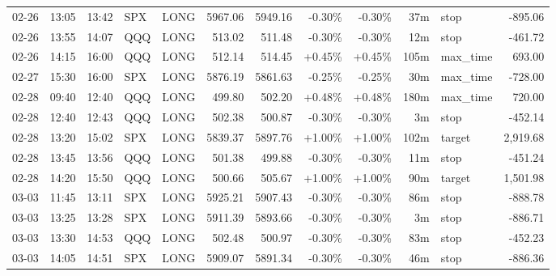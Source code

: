 \documentclass[11pt,a4paper]{article}
\begin{document}
\begin{center}
\begin{longtable}{>{\color{txtmain}}l l l l l r r r r r >{\color{txtmain}}l r}
02-26 & 13:05 & 13:42 & SPX & LONG & 5967.06 & 5949.16 & \textcolor{lossred}{-0.30\%} & \textcolor{lossred}{-0.30\%} & 37m & stop & \textcolor{lossred}{-895.06} \\
02-26 & 13:55 & 14:07 & QQQ & LONG & 513.02 & 511.48 & \textcolor{lossred}{-0.30\%} & \textcolor{lossred}{-0.30\%} & 12m & stop & \textcolor{lossred}{-461.72} \\
02-26 & 14:15 & 16:00 & QQQ & LONG & 512.14 & 514.45 & \textcolor{wingreen}{+0.45\%} & \textcolor{wingreen}{+0.45\%} & 105m & max\_time & \textcolor{wingreen}{693.00} \\
02-27 & 15:30 & 16:00 & SPX & LONG & 5876.19 & 5861.63 & \textcolor{lossred}{-0.25\%} & \textcolor{lossred}{-0.25\%} & 30m & max\_time & \textcolor{lossred}{-728.00} \\
02-28 & 09:40 & 12:40 & QQQ & LONG & 499.80 & 502.20 & \textcolor{wingreen}{+0.48\%} & \textcolor{wingreen}{+0.48\%} & 180m & max\_time & \textcolor{wingreen}{720.00} \\
02-28 & 12:40 & 12:43 & QQQ & LONG & 502.38 & 500.87 & \textcolor{lossred}{-0.30\%} & \textcolor{lossred}{-0.30\%} & 3m & stop & \textcolor{lossred}{-452.14} \\
02-28 & 13:20 & 15:02 & SPX & LONG & 5839.37 & 5897.76 & \textcolor{wingreen}{+1.00\%} & \textcolor{wingreen}{+1.00\%} & 102m & target & \textcolor{wingreen}{2,919.68} \\
02-28 & 13:45 & 13:56 & QQQ & LONG & 501.38 & 499.88 & \textcolor{lossred}{-0.30\%} & \textcolor{lossred}{-0.30\%} & 11m & stop & \textcolor{lossred}{-451.24} \\
02-28 & 14:20 & 15:50 & QQQ & LONG & 500.66 & 505.67 & \textcolor{wingreen}{+1.00\%} & \textcolor{wingreen}{+1.00\%} & 90m & target & \textcolor{wingreen}{1,501.98} \\
03-03 & 11:45 & 13:11 & SPX & LONG & 5925.21 & 5907.43 & \textcolor{lossred}{-0.30\%} & \textcolor{lossred}{-0.30\%} & 86m & stop & \textcolor{lossred}{-888.78} \\
03-03 & 13:25 & 13:28 & SPX & LONG & 5911.39 & 5893.66 & \textcolor{lossred}{-0.30\%} & \textcolor{lossred}{-0.30\%} & 3m & stop & \textcolor{lossred}{-886.71} \\
03-03 & 13:30 & 14:53 & QQQ & LONG & 502.48 & 500.97 & \textcolor{lossred}{-0.30\%} & \textcolor{lossred}{-0.30\%} & 83m & stop & \textcolor{lossred}{-452.23} \\
03-03 & 14:05 & 14:51 & SPX & LONG & 5909.07 & 5891.34 & \textcolor{lossred}{-0.30\%} & \textcolor{lossred}{-0.30\%} & 46m & stop & \textcolor{lossred}{-886.36} \\

\end{longtable}
\end{center}
\end{document}
